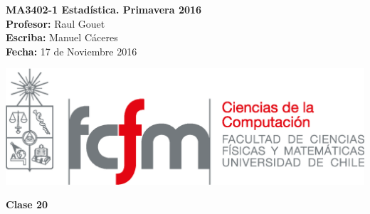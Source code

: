 \documentclass[10pt]{article}
\theoremstyle{plain}
\theoremstyle{definition}
\newcommand{\catnum}{20} %
\newcommand{\fecha}{17 de Noviembre 2016 }
\begin{document}
\vspace*{-1.2 cm}
\begin{minipage}{0.6\textwidth}
\begin{flushleft}
\hspace*{-0.5cm}\textbf{MA3402-1 Estadística. Primavera 2016}\\
\hspace*{-0.5cm}\textbf{Profesor:} Raul Gouet\\
\hspace*{-0.5cm}\textbf{Escriba:} Manuel Cáceres\\
\hspace*{-0.5cm}\textbf{Fecha:} \fecha
\end{flushleft}
\end{minipage}
\begin{minipage}{0.36\textwidth}
\begin{flushright}
\includegraphics[scale=0.3]{imagenes/fcfm_dcc}
\end{flushright}
\end{minipage}
\bigskip

\begin{center}
\LARGE\textbf{Clase \catnum}
\end{center}
\end{document}
